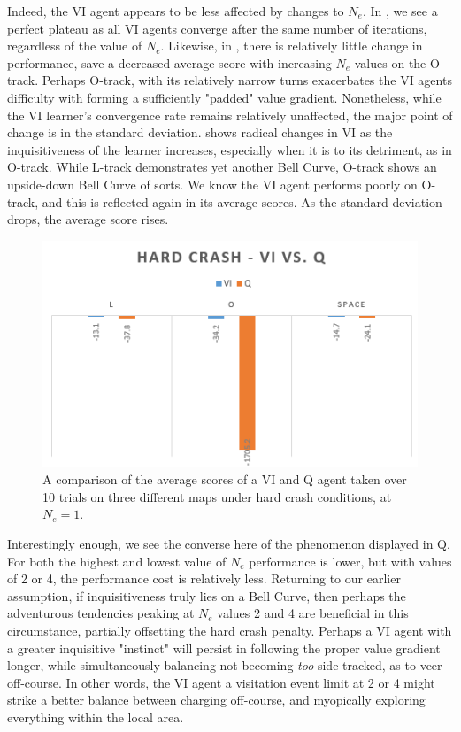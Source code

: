 \documentclass[12pt, letter]{article}
\begin{document}
Indeed, the VI agent appears to be less affected by changes to $N_e$.  In , we see a perfect plateau as all VI agents converge after the same number of iterations, regardless of the value of $N_e$.  Likewise, in , there is relatively little change in performance, save a decreased average score with increasing $N_e$ values on the O-track.  Perhaps O-track, with its relatively narrow turns exacerbates the VI agents difficulty with forming a sufficiently "padded" value gradient.  Nonetheless, while the VI learner's convergence rate remains relatively unaffected, the major point of change is in the standard deviation.  shows radical changes in VI as the inquisitiveness of the learner increases, especially when it is to its detriment, as in O-track.  While L-track demonstrates yet another Bell Curve, O-track shows an upside-down Bell Curve of sorts.  We know the VI agent performs poorly on O-track, and this is reflected again in its average scores.  As the standard deviation drops, the average score rises.

\begin{figure} 
    \centering
    \includegraphics[width=.6\textwidth]{img/hard_vVq}
    \caption{A comparison of the average scores of a VI and Q agent taken over 10 trials on three different maps under hard crash conditions, at $N_e =1$.}
    \label{fig:hardvVq}
\end{figure}

Interestingly enough, we see the converse here of the phenomenon displayed in Q.  For both the highest and lowest value of $N_e$ performance is lower, but with values of 2 or 4, the performance cost is relatively less.  Returning to our earlier assumption, if inquisitiveness truly lies on a Bell Curve, then perhaps the adventurous tendencies peaking at $N_e$ values 2 and 4 are beneficial in this circumstance, partially offsetting the hard crash penalty.  Perhaps a VI agent with a greater inquisitive "instinct" will persist in following the proper value gradient longer, while simultaneously balancing not becoming \emph{too} side-tracked, as to veer off-course.  In other words, the VI agent a visitation event limit at 2 or 4 might strike a better balance between charging off-course, and myopically exploring everything within the local area.
\\ \\
\end{document}
